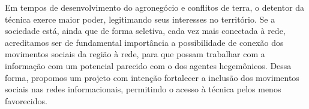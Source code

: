 Em tempos de desenvolvimento do agronegócio e conflitos de terra, o detentor da técnica exerce maior poder, legitimando seus interesses no território. Se a sociedade está, ainda que de forma seletiva, cada vez mais conectada à rede, acreditamos ser de fundamental importância a possibilidade de conexão dos movimentos sociais da região à rede, para que possam trabalhar com a informação com um potencial parecido com o dos agentes hegemônicos. Dessa forma, propomos um projeto com intenção fortalecer a inclusão dos movimentos sociais nas redes informacionais, permitindo o acesso à técnica pelos menos favorecidos.

